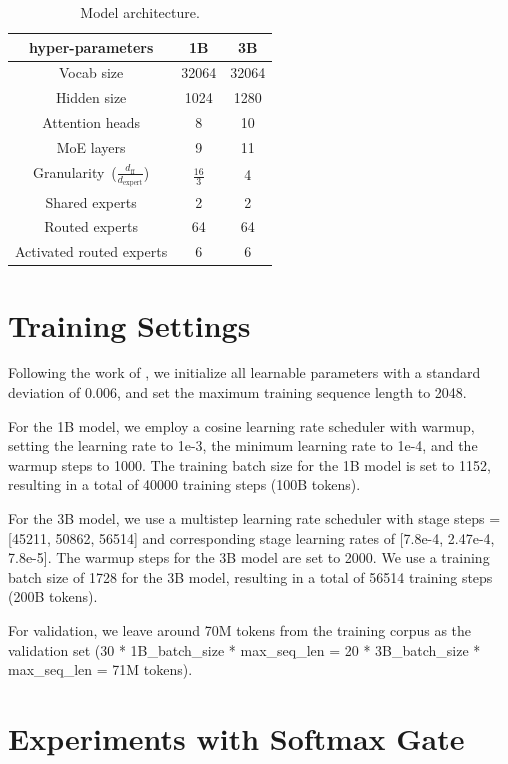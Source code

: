 \documentclass{article}
\begin{document}
\begin{table}[t]
\caption{Model architecture.}
\label{tab:1B3B_architecture}
\begin{center}
\begin{tabular}{c|cc}
\toprule
\textbf{hyper-parameters} & \textbf{1B} & \textbf{3B} \\
\midrule
Vocab size & 32064 & 32064\\
Hidden size & 1024 & 1280\\
Attention heads & 8 & 10\\
MoE layers & 9 & 11\\
Granularity~($\frac{d_\text{ff}}{d_\text{expert}}$) & $\frac{\text{16}}{\text{3}}$ & 4\\
Shared experts & 2 & 2\\
Routed experts & 64 & 64\\
Activated routed experts & 6 & 6\\
\bottomrule
\end{tabular}
\end{center}
\end{table}

\section{Training Settings}
\label{app:training_settingd}
Following the work of \cite{Dai2024DeepSeekMoETU}, we initialize all learnable parameters with a standard deviation of 0.006, and set the maximum training sequence length to 2048.

For the 1B model, we employ a cosine learning rate scheduler with warmup, setting the learning rate to 1e-3, the minimum learning rate to 1e-4, and the warmup steps to 1000. The training batch size for the 1B model is set to 1152, resulting in a total of 40000 training steps (100B tokens).

For the 3B model, we use a multistep learning rate scheduler with stage steps = [45211, 50862, 56514] and corresponding stage learning rates of [7.8e-4, 2.47e-4, 7.8e-5]. The warmup steps for the 3B model are set to 2000. We use a training batch size of 1728 for the 3B model, resulting in a total of 56514 training steps (200B tokens).

For validation, we leave around 70M tokens from the training corpus as the validation set (30 * 1B\_batch\_size * max\_seq\_len = 20 * 3B\_batch\_size * max\_seq\_len = 71M tokens).

\section{Experiments with Softmax Gate}
\label{app:softmax_gate}
\end{document}
